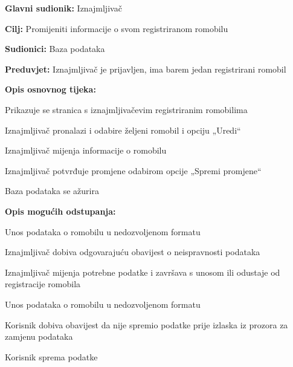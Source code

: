 						\begin{packed_item}
							
							\item \textbf{Glavni sudionik: }Iznajmljivač
							\item  \textbf{Cilj: }Promijeniti informacije o svom registriranom romobilu
							\item  \textbf{Sudionici:} Baza podataka
							\item  \textbf{Preduvjet:} Iznajmljivač je prijavljen, ima barem jedan registrirani romobil
							\item  \textbf{Opis osnovnog tijeka:}
							
							\item[] \begin{packed_enum}
								
								\item Prikazuje se stranica s iznajmljivačevim registriranim romobilima
								\item Iznajmljivač pronalazi i odabire željeni romobil i opciju „Uredi“
								\item Iznajmljivač mijenja informacije o romobilu
								\item Iznajmljivač potvrđuje promjene odabirom opcije „Spremi promjene“
								\item Baza podataka se ažurira
								
							\end{packed_enum}
							
							\item  \textbf{Opis mogućih odstupanja:}
							
							\item[] \begin{packed_item}
								
								\item[3.a] Unos podataka o romobilu u nedozvoljenom formatu
								\item[] \begin{packed_enum}
									
									\item Iznajmljivač dobiva odgovarajuću obavijest o neispravnosti podataka 
									\item Iznajmljivač mijenja potrebne podatke i završava s unosom ili odustaje od registracije romobila
									
								\end{packed_enum}
								
								\item[4.a] 	Unos podataka o romobilu u nedozvoljenom formatu
								\item[] \begin{packed_enum}
									
									\item Korisnik dobiva obavijest da nije spremio podatke prije izlaska iz prozora za zamjenu podataka
									\item Korisnik sprema podatke
									
								\end{packed_enum}
								
								
							\end{packed_item}
						\end{packed_item}
